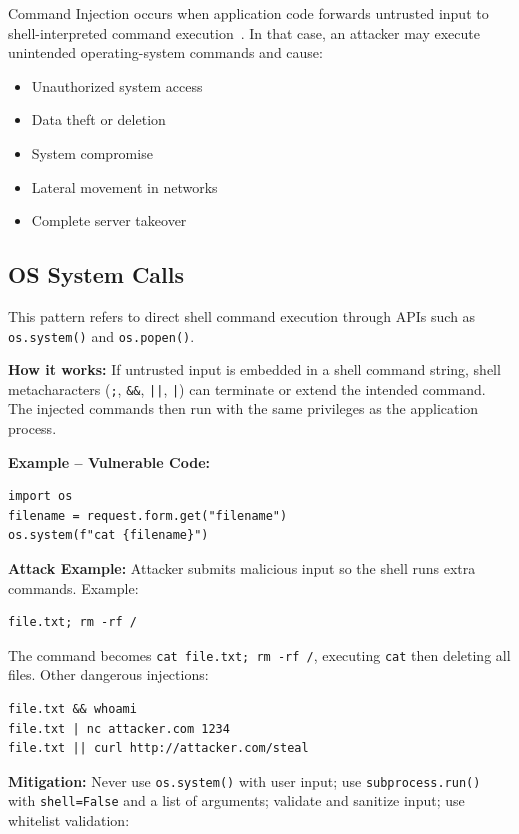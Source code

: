 Command Injection occurs when application code forwards untrusted input to shell-interpreted command execution~\cite{OWASPTop10,OWASPCommandInjection,CWE78}. In that case, an attacker may execute unintended operating-system commands and cause:
\begin{itemize}
	\item Unauthorized system access
	\item Data theft or deletion
	\item System compromise
	\item Lateral movement in networks
	\item Complete server takeover
\end{itemize}

\subsection{OS System Calls}
\label{sec:cmd_os_system}

This pattern refers to direct shell command execution through APIs such as \texttt{os.system()} and \texttt{os.popen()}.

\textbf{How it works:} If untrusted input is embedded in a shell command string, shell metacharacters (\texttt{;}, \texttt{\&\&}, \texttt{||}, \texttt{|}) can terminate or extend the intended command. The injected commands then run with the same privileges as the application process.

\textbf{Example -- Vulnerable Code:}

\begin{lstlisting}[style=pycode]
import os
filename = request.form.get("filename")
os.system(f"cat {filename}")
\end{lstlisting}

\textbf{Attack Example:} Attacker submits malicious input so the shell runs extra commands. Example:
\begin{lstlisting}[style=attackcode]
file.txt; rm -rf /
\end{lstlisting}
The command becomes \texttt{cat file.txt; rm -rf /}, executing \texttt{cat} then deleting all files. Other dangerous injections:
\begin{lstlisting}[style=attackcode]
file.txt && whoami
file.txt | nc attacker.com 1234
file.txt || curl http://attacker.com/steal
\end{lstlisting}

\textbf{Mitigation:} Never use \texttt{os.system()} with user input; use \texttt{subprocess.run()} with \texttt{shell=False} and a list of arguments; validate and sanitize input; use whitelist validation:

